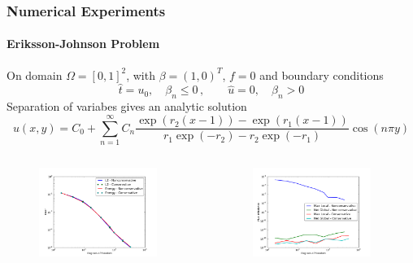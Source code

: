 \documentclass[18pt,xcolor=table]{beamer}
\begin{document}
\begin{frame}
\frametitle{Numerical Experiments}
\framesubtitle{Eriksson-Johnson Problem}
On domain $\Omega=[0,1]^2$, with $\beta=(1,0)^T$, $f=0$ and boundary
conditions
\[
\hat t=u_0,\quad\beta_n\le0\,,\quad\quad\hat u=0,\quad\beta_n > 0
\]
Separation of variabes gives an analytic solution
\[
u(x,y)=C_0+\sum_{n=1}^\infty C_n
\frac{\exp(r_2(x-1))-\exp(r_1(x-1))}{r_1\exp(-r_2)-r_2\exp(-r_1)}
\cos(n\pi y)
\]
\vspace{-5ex}
\begin{columns}[b]
\begin{column}{0.5\textwidth}
\begin{figure}[t]
\centering
\includegraphics[width=0.9\textwidth]{Erickson/modifiedError.pdf}

\end{figure}
\end{column}
\begin{column}{0.5\textwidth}
\begin{figure}[t]
\centering
\includegraphics[width=0.9\textwidth]{Erickson/modifiedFlux.pdf}

\end{figure}
\end{column}
\end{columns}
\end{frame}

\end{document}
